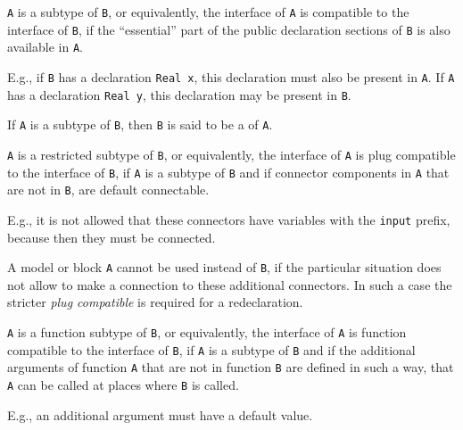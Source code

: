 \begin{definition}
\lstinline!A! is a subtype of \lstinline!B!, or equivalently, the interface of \lstinline!A! is compatible to the interface of \lstinline!B!, if the ``essential'' part of the public declaration sections of \lstinline!B! is also available in \lstinline!A!.
\par
\begin{nonnormative*}
E.g., if \lstinline!B! has a declaration \lstinline!Real x!, this declaration must also be present in \lstinline!A!.
If \lstinline!A! has a declaration \lstinline!Real y!, this declaration may be present in \lstinline!B!.
\end{nonnormative*}
\end{definition}

If \lstinline!A! is a subtype of \lstinline!B!, then \lstinline!B! is said to be a  of \lstinline!A!.

\begin{definition}
\lstinline!A! is a restricted subtype of \lstinline!B!, or equivalently, the interface of \lstinline!A! is plug compatible to the interface of \lstinline!B!, if \lstinline!A! is a subtype of \lstinline!B! and if connector components in \lstinline!A! that are not in \lstinline!B!, are default connectable.
\begin{nonnormative}
E.g., it is not allowed that these connectors have variables with the \lstinline!input! prefix, because then they must be connected.
\end{nonnormative}
A model or block \lstinline!A! cannot be used instead of \lstinline!B!, if the particular situation does not allow to make a connection to these additional connectors.
In such a case the stricter \emph{plug compatible} is required for a redeclaration.
\end{definition}

\begin{definition}
\lstinline!A! is a function subtype of \lstinline!B!, or equivalently, the interface of \lstinline!A! is function compatible to the interface of \lstinline!B!, if \lstinline!A! is a subtype of \lstinline!B! and if the additional arguments of function \lstinline!A! that are not in function \lstinline!B! are defined in such a way, that \lstinline!A! can be called at places where \lstinline!B! is called.
\par
\begin{nonnormative*}
E.g., an additional argument must have a default value.
\end{nonnormative*}
\end{definition}

